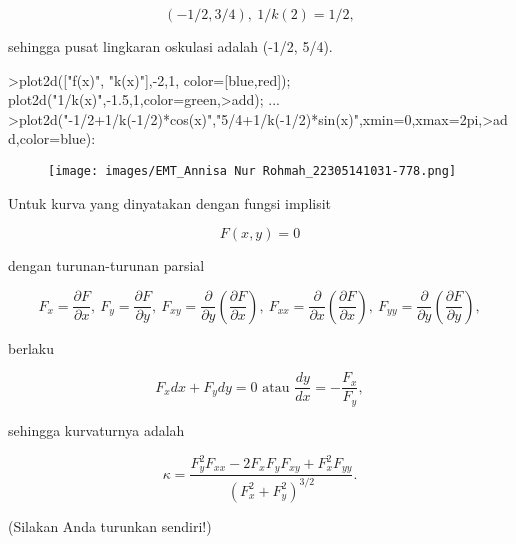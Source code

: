 \documentclass[a4paper,10pt]{article}
\begin{document}
\begin{eulernotebook}
\begin{eulercomment}
\end{eulercomment}
\begin{eulerformula}
\[
(-1/2,3/4),\ 1/k(2)=1/2,
\]
\end{eulerformula}
\begin{eulercomment}
sehingga pusat lingkaran oskulasi adalah (-1/2, 5/4).
\end{eulercomment}
\begin{eulerprompt}
>plot2d(["f(x)", "k(x)"],-2,1, color=[blue,red]); plot2d("1/k(x)",-1.5,1,color=green,>add); ...
>plot2d("-1/2+1/k(-1/2)*cos(x)","5/4+1/k(-1/2)*sin(x)",xmin=0,xmax=2pi,>add,color=blue):
\end{eulerprompt}
\begin{figure}[h]
    \centering
    \texttt{[image: images/EMT\_Annisa Nur Rohmah\_22305141031-778.png]}
\end{figure}
\begin{eulercomment}
Untuk kurva yang dinyatakan dengan fungsi implisit

\end{eulercomment}
\begin{eulerformula}
\[
F(x,y)=0
\]
\end{eulerformula}
\begin{eulercomment}
dengan turunan-turunan parsial

\end{eulercomment}
\begin{eulerformula}
\[
F_x=\frac{\partial F}{\partial x},\ F_y=\frac{\partial F}{\partial y},\ F_{xy}=\frac{\partial}{\partial y}\left(\frac{\partial F}{\partial x}\right),\ F_{xx}=\frac{\partial}{\partial x}\left(\frac{\partial F}{\partial x}\right),\ F_{yy}=\frac{\partial}{\partial y}\left(\frac{\partial F}{\partial y}\right),
\]
\end{eulerformula}
\begin{eulercomment}
berlaku

\end{eulercomment}
\begin{eulerformula}
\[
F_x dx+ F_y dy = 0\text{ atau } \frac{dy}{dx}=-\frac{F_x}{F_y},
\]
\end{eulerformula}
\begin{eulercomment}
sehingga kurvaturnya adalah

\end{eulercomment}
\begin{eulerformula}
\[
\kappa =\frac {F_y^2F_{xx}-2F_xF_yF_{xy}+F_x^2F_{yy}}{\left(F_x^2+F_y^2\right)^{3/2}}.
\]
\end{eulerformula}
\begin{eulercomment}
(Silakan Anda turunkan sendiri!)


\end{eulercomment}
\end{eulernotebook}
\end{document}
